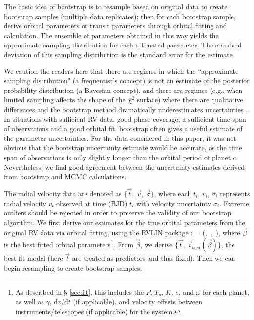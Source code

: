 The basic idea of bootstrap is to resample based on original data
to create bootstrap samples (multiple data replicates); then for
each bootstrap sample, derive orbital parameters or transit parameters
through orbital fitting and calculation. The ensemble of parameters
obtained in this way yields the approximate sampling distribution for
each estimated parameter. The standard deviation of this sampling
distribution is the standard error for the estimate.

We caution the readers here that there are regimes in which the
``approximate sampling distribution" (a frequentist's concept) is not
an estimate of the posterior probability distribution (a Bayesian
concept), and there are regimes (e.g., when limited sampling affects
the shape of the $\chi^2$ surface) where there are qualitative
differences and the bootstrap method dramatically underestimates
uncertainties \citep[e.g., long-period planets when the observations
  are not yet sufficient to pin down the orbital
  period;][]{Ford2005,Bender2012}. In situations with sufficient RV
data, good phase coverage, a sufficient time span of observations and
a good orbital fit, bootstrap often gives a useful estimate of the
parameter uncertainties. For the data considered in this paper, it
was not obvious that the bootstrap uncertainty estimate would be
accurate, as the time span of observations is only slightly longer than
the orbital period of planet $c$. Nevertheless, we find good agreement
between the uncertainty estimates derived from bootstrap and MCMC
calculations.

The radial velocity data are denoted as $\lbrace \vec{t},\ \vec{v},\ \vec{\sigma}
\rbrace$, where each $t_i$, $v_i$, $\sigma_i$ represents radial
velocity $v_i$ observed at time (BJD) $t_i$ with velocity uncertainty
$\sigma_i$. Extreme outliers should be rejected in order to preserve the
validity of our bootstrap algorithm. We first derive our estimates for
the true orbital parameters from the original RV data via orbital fitting,
using the RVLIN package \citep{2009ApJS..182..205W}: \beq \vec{\beta}
= \mu(,\ ,\ \vec{\sigma}), \eeq where $\vec{\beta}$ is
the best fitted orbital parameters\footnote{As described in \S
  \ref{sec:fit}, this includes the $P$, $T_p$, $K$, $e$, and $\omega$
  for each planet, as well as $\gamma$, $\mbox{d}v/\mbox{d}t$ (if
  applicable), and velocity offsets between instruments/telescopes (if
  applicable) for the system.}. From $\vec{\beta}$, we derive $\lbrace
\vec{t},\ \vec{v}_{best}(\vec{\beta}) \rbrace$, the best-fit model
(here $\vec{t}$ are treated as predictors and thus fixed). Then we can
begin resampling to create bootstrap samples.

